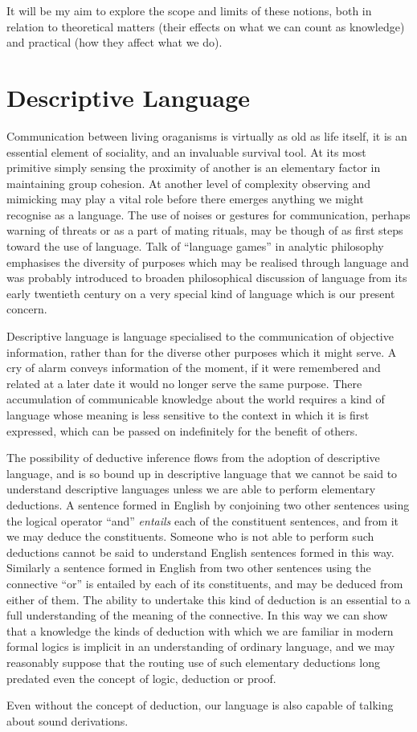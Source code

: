 It will be my aim to explore the scope and limits of these notions, both in relation to theoretical matters (their effects on what we can count as knowledge) and practical (how they affect what we do).

\section{Descriptive Language}

Communication between living oraganisms is virtually as old as life itself, it is an essential element of sociality, and an invaluable survival tool.
At its most primitive simply sensing the proximity of another is an elementary factor in maintaining group cohesion.
At another level of complexity observing and mimicking may play a vital role before there emerges anything we might recognise as a language.
The use of noises or gestures for communication, perhaps warning of threats or as a part of mating rituals, may be though of as first steps toward the use of language.
Talk of ``language games'' in analytic philosophy emphasises the diversity of purposes which may be realised through language and was probably introduced to broaden philosophical discussion of language from its early twentieth century on a very special kind of language which is our present concern.

Descriptive language is language specialised to the communication of objective information, rather than for the diverse other purposes which it might serve.
A cry of alarm conveys information of the moment, if it were remembered and related at a later date it would no longer serve the same purpose.
There accumulation of communicable knowledge about the world requires a kind of language whose meaning is less sensitive to the context in which it is first expressed, which can be passed on indefinitely for the benefit of others.

The possibility of deductive inference flows from the adoption of descriptive language, and is so bound up in descriptive language that we cannot be said to understand descriptive languages unless we are able to perform elementary deductions.
A sentence formed in English by conjoining two other sentences using the logical operator ``and'' {\it entails} each of the constituent sentences, and from it we may deduce the constituents.
Someone who is not able to perform such deductions cannot be said to understand English sentences formed in this way.
Similarly a sentence formed in English from two other sentences using the connective ``or'' is entailed by each of its constituents, and may be deduced from either of them.
The ability to undertake this kind of deduction is an essential to a full understanding of the meaning of the connective.
In this way we can show that a knowledge the kinds of deduction with which we are familiar in modern formal logics is implicit in an understanding of ordinary language, and we may reasonably suppose that the routing use of such elementary deductions long predated even the concept of logic, deduction or proof.

Even without the concept of deduction, our language is also capable of talking about sound derivations.
